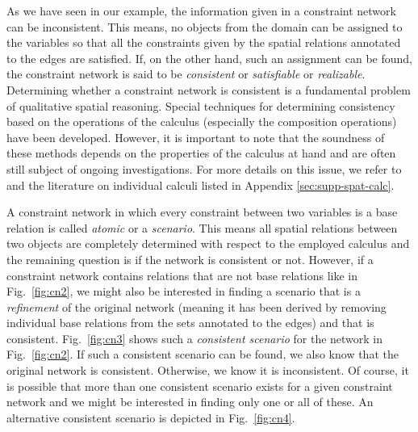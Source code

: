\documentclass[headsepline]{scrreprt}
\theoremstyle{definition}
\newlength{\rest}
\begin{document}
As we have seen in our example, the information
given in a constraint network can be inconsistent. This means,
no objects from the domain can be assigned to the
variables so that all the constraints given by the spatial
relations annotated to the edges are satisfied. If,
on the other hand, such
an assignment can be found, the constraint network is
said to be \emph{consistent} or \emph{satisfiable} or \emph{realizable}.
Determining whether a constraint network is consistent is
a fundamental problem of qualitative spatial reasoning.
Special techniques for determining consistency based on the operations
of the calculus (especially the composition operations) have
been developed. However, it is important to note that
the soundness of these methods depends on the properties
of the calculus at hand and are often still subject of
ongoing investigations. For more details on this issue,
we refer to \citet{RenzL05_WeakComposition}
and the literature on individual
calculi listed in Appendix \ref{sec:supp-spat-calc}.

A constraint network in which every constraint between
two variables is a base relation is called \emph{atomic}
or a \emph{scenario}. This means all spatial relations
between two objects are completely determined with
respect to the employed calculus and the remaining
question is if the network is consistent or not.
However, if a constraint network contains relations
that are not base relations like in Fig.~\ref{fig:cn2},
we might also be interested in finding a scenario
that is a \emph{refinement} of the original network
(meaning it has been derived by removing individual base
relations from the sets annotated to the edges) and
that is consistent. Fig.~\ref{fig:cn3} shows such a
\emph{consistent scenario} for the network in
Fig.~\ref{fig:cn2}. If such a consistent scenario
can be found, we also know that the original network
is consistent. Otherwise, we know it is inconsistent.
Of course, it is possible that more than one
consistent scenario exists for a given constraint
network and we might be interested in finding
only one or all of these. An alternative
consistent scenario is depicted in Fig.~\ref{fig:cn4}.
\end{document}
